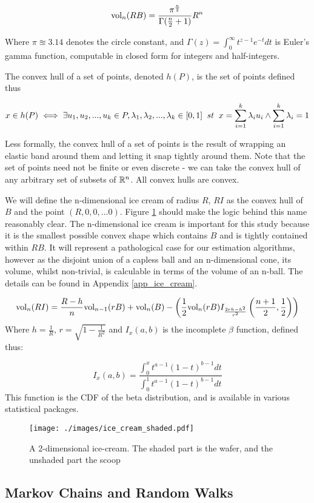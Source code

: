 $$
\mbox{vol}_n(RB) = \frac{\pi^{\frac{n}{2}}}{\Gamma(\frac{n}{2}+1)}R^n
$$

Where $\pi \approxeq 3.14$ denotes the circle constant, and $\Gamma(z) = \int^\infty_0 t^{z-1}e^{-t} dt$ is Euler's gamma function, computable in closed form for integers and half-integers.

The convex hull of a set of points, denoted $h(P)$, is the set of points defined thus

$$
x \in h(P) \iff \exists u_1, u_2,...,u_k \in P, \lambda_1, \lambda_2, ..., \lambda_k  \in [0,1] \;\; st \;\; x = \sum^{k}_{i=1} \lambda_i u_i \wedge \sum^{k}_{i=1} \lambda_i = 1
$$

Less formally, the convex hull of a set of points is the result of wrapping an elastic band around them and letting it snap tightly around them. Note that the set of points need not be finite or even discrete - we can take the convex hull of any arbitrary set of subsets of $\mathbb{R}^n$. All convex hulls are convex.

We will define the n-dimensional ice cream of radius $R$, $RI$ as the convex hull of $B$ and the point $(R,0,0,...0)$. Figure \ref{fig_ice_cream} should make the logic behind this name reasonably clear. The n-dimensional ice cream is important for this study because it is the smallest possible convex shape which contains $B$ and is tightly contained within $RB$. It will represent a pathological case for our estimation algorithms, however as the disjoint union of a capless ball and an n-dimensional cone, its volume, whilst non-trivial, is calculable in terms of the volume of an n-ball. The details can be found in Appendix \ref{app_ice_cream}.

$$
\mbox{vol}_n(RI) = \frac{R-h}{n} \mbox{vol}_{n-1}(rB) + \mbox{vol}_n(B) - \left(\frac{1}{2}\mbox{vol}_n(rB) I_{\frac{2rh-h^2}{r^2}}\left(\frac{n+1}{2}, \frac{1}{2}\right)\right)
$$
Where $h = \frac{1}{R}$, $r = \sqrt{1-\frac{1}{R^2}}$ and $I_x(a,b)$ is the incomplete $\beta$ function, defined thus:

$$
I_x(a,b) = \frac{\int^x_0 t^{a-1}(1-t)^{b-1}dt}{\int^1_0 t^{a-1}(1-t)^{b-1} dt}
$$
This function is the CDF of the beta distribution, and is available in various statistical packages.
\begin{figure}
\centering
\texttt{[image: ./images/ice\_cream\_shaded.pdf]}
\caption{A 2-dimensional ice-cream. The shaded part is the wafer, and the unshaded part the scoop}
\label{fig_ice_cream}
\end{figure}

\subsection{Markov Chains and Random Walks}

